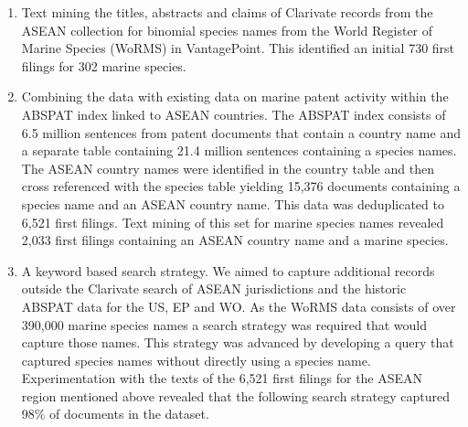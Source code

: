 \documentclass[]{book}
\theoremstyle{definition}
\theoremstyle{definition}
\theoremstyle{definition}
\theoremstyle{remark}
\begin{document}
\begin{enumerate}
\def\labelenumi{\alph{enumi})}
\item
  Text mining the titles, abstracts and claims of Clarivate records from
  the ASEAN collection for binomial species names from the World
  Register of Marine Species (WoRMS) in VantagePoint. This identified an
  initial 730 first filings for 302 marine species.
\item
  Combining the data with existing data on marine patent activity within
  the ABSPAT index linked to ASEAN countries. The ABSPAT index consists
  of 6.5 million sentences from patent documents that contain a country
  name and a separate table containing 21.4 million sentences containing
  a species names. The ASEAN country names were identified in the
  country table and then cross referenced with the species table
  yielding 15,376 documents containing a species name and an ASEAN
  country name. This data was deduplicated to 6,521 first filings. Text
  mining of this set for marine species names revealed 2,033 first
  filings containing an ASEAN country name and a marine species.
\item
  A keyword based search strategy. We aimed to capture additional
  records outside the Clarivate search of ASEAN jurisdictions and the
  historic ABSPAT data for the US, EP and WO. As the WoRMS data consists
  of over 390,000 marine species names a search strategy was required
  that would capture those names. This strategy was advanced by
  developing a query that captured species names without directly using
  a species name. Experimentation with the texts of the 6,521 first
  filings for the ASEAN region mentioned above revealed that the
  following search strategy captured 98\% of documents in the dataset.
\end{enumerate}
\end{document}
